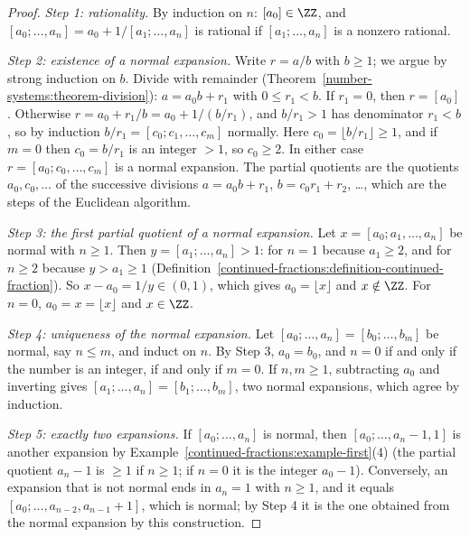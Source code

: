 \begin{proof}
\emph{Step 1: rationality.} By induction on $n$: $[a_0] \in \ZZ$, and $[a_0; \ldots, a_n] = a_0 + 1/[a_1; \ldots, a_n]$ is rational if $[a_1; \ldots, a_n]$ is a nonzero rational.

\emph{Step 2: existence of a normal expansion.} Write $r = a/b$ with $b \geq 1$; we argue by strong induction on $b$. Divide with remainder (Theorem~\ref{number-systems:theorem-division}):
$a = a_0b + r_1$ with $0 \leq r_1 < b$. If $r_1 = 0$, then $r = [a_0]$. Otherwise $r = a_0 + r_1/b = a_0 + 1/(b/r_1)$, and $b/r_1 > 1$ has denominator $r_1 < b$, so by induction
$b/r_1 = [c_0; c_1, \ldots, c_m]$ normally. Here $c_0 = \lfloor b/r_1 \rfloor \geq 1$, and if $m = 0$ then $c_0 = b/r_1$ is an integer $> 1$, so $c_0 \geq 2$. In either case
$r = [a_0; c_0, \ldots, c_m]$ is a normal expansion. The partial quotients are the quotients $a_0, c_0, \ldots$ of the successive divisions $a = a_0b + r_1$, $b = c_0r_1 + r_2$, \ldots, which are
the steps of the Euclidean algorithm.

\emph{Step 3: the first partial quotient of a normal expansion.} Let $x = [a_0; a_1, \ldots, a_n]$ be normal with $n \geq 1$. Then $y = [a_1; \ldots, a_n] > 1$: for $n = 1$ because $a_1 \geq 2$, and
for $n \geq 2$ because $y > a_1 \geq 1$ (Definition~\ref{continued-fractions:definition-continued-fraction}). So $x - a_0 = 1/y \in (0, 1)$, which gives $a_0 = \lfloor x \rfloor$ and
$x \notin \ZZ$. For $n = 0$, $a_0 = x = \lfloor x \rfloor$ and $x \in \ZZ$.

\emph{Step 4: uniqueness of the normal expansion.} Let $[a_0; \ldots, a_n] = [b_0; \ldots, b_m]$ be normal, say $n \leq m$, and induct on $n$. By Step 3, $a_0 = b_0$, and $n = 0$ if and only if
the number is an integer, if and only if $m = 0$. If $n, m \geq 1$, subtracting $a_0$ and inverting gives $[a_1; \ldots, a_n] = [b_1; \ldots, b_m]$, two normal expansions, which agree by induction.

\emph{Step 5: exactly two expansions.} If $[a_0; \ldots, a_n]$ is normal, then $[a_0; \ldots, a_n - 1, 1]$ is another expansion by Example~\ref{continued-fractions:example-first}(4) (the
partial quotient $a_n - 1$ is $\geq 1$ if $n \geq 1$; if $n = 0$ it is the integer $a_0 - 1$). Conversely, an expansion that is not normal ends in $a_n = 1$ with $n \geq 1$, and it equals
$[a_0; \ldots, a_{n-2}, a_{n-1} + 1]$, which is normal; by Step 4 it is the one obtained from the normal expansion by this construction.
\end{proof}

